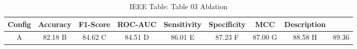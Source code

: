 \begin{table}[htbp]
\caption{IEEE Table: Table 03 Ablation}
\label{tab:table_03_ablation}
\centering
\begin{tabular}{|c|c|c|c|c|c|c|c|}
\hline
Config & Accuracy & F1-Score & ROC-AUC & Sensitivity & Specificity & MCC & Description \\
\hline\hline
A & 82.18%
\hline
B & 84.62%
\hline
C & 84.51%
\hline
D & 86.01%
\hline
E & 87.23%
\hline
F & 87.00%
\hline
G & 88.58%
\hline
H & 89.36%
\hline
\end{tabular}
\end{table}
